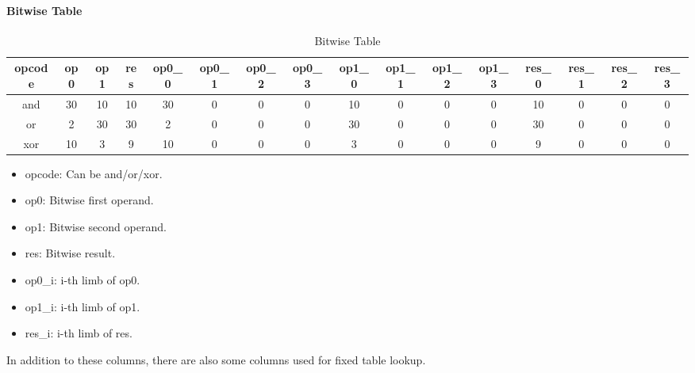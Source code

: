 \paragraph{Bitwise Table} \label{sec:bitwise-table}
\begin{table}[!ht]
    \centering
    \begin{adjustwidth}{-1cm}{}
        \begin{tabular}{|c|c|c|c|c|c|c|c|c|c|c|c|c|c|c|c|}
            \hline
            \rowcolor{gray} opcode & op0 & op1 & res & op0\_0 & op0\_1 & op0\_2 & op0\_3 & op1\_0 & op1\_1 & op1\_2 & op1\_3 & res\_0 & res\_1 & res\_2 & res\_3 \\
            \hline
            and                    & 30  & 10  & 10  & 30     & 0      & 0      & 0      & 10     & 0      & 0      & 0      & 10     & 0      & 0      & 0      \\
            \hline
            or                     & 2   & 30  & 30  & 2      & 0      & 0      & 0      & 30     & 0      & 0      & 0      & 30     & 0      & 0      & 0      \\
            \hline
            xor                    & 10  & 3   & 9   & 10     & 0      & 0      & 0      & 3      & 0      & 0      & 0      & 9      & 0      & 0      & 0      \\
            \hline
        \end{tabular}
    \end{adjustwidth}
    \caption{Bitwise Table}
    \label{table:bitwise-table}
\end{table}
\begin{itemize}
    \item opcode: Can be and/or/xor.
    \item op0: Bitwise first operand.
    \item op1: Bitwise second operand.
    \item res: Bitwise result.
    \item op0\_i: i-th limb of op0.
    \item op1\_i: i-th limb of op1.
    \item res\_i: i-th limb of res.
\end{itemize}
In addition to these columns, there are also some columns used for fixed table lookup.
